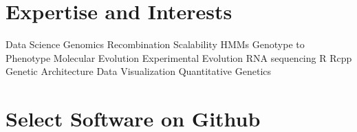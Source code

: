\documentclass[11pt,letterpaper,sans]{moderncv}        %
\begin{document}
\vspace{4pt}

\section{Expertise and Interests}
Data Science  Genomics  Recombination  Scalability  HMMs   Genotype to Phenotype  Molecular Evolution  Experimental Evolution  RNA sequencing  R  Rcpp  Genetic Architecture  Data Visualization  Quantitative Genetics

\section{Select Software on Github}
\end{document}

